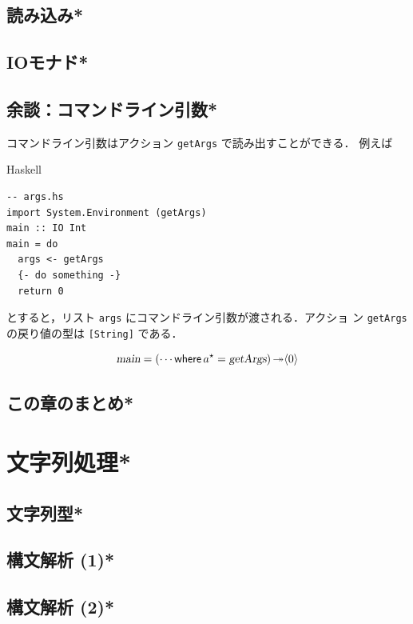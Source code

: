 \documentclass[a5paper,twoside,fleqn,draft]{jsbook}
\newcommand{\programminglanguage}[1]{\textsf{#1}}
\newcommand{\haskell}{\programminglanguage{Haskell}}
\newcommand{\code}[1]{\texttt{#1}}
\newenvironment{haskellcode}{\begin{itembox}[r]{\haskell}}{\end{itembox}}
\newcommand{\mKeyword}[1]{\mathsf{#1}} %
\newcommand{\mWhereKeyword}{\mKeyword{where}}
\DeclareMathOperator{\mWhere}{\mWhereKeyword}
\newcommand{\mAction}[1]{\textsl{#1}}
\DeclareMathOperator{\mMain}{\mAction{main}}
\DeclareMathOperator{\mBindRightIgnore}{\twoheadrightarrow}
\newcommand{\mPureWith}[1]{\langle#1\rangle}
\newcommand{\mList}[1]{{#1}^\mathrm{\star}}
\begin{document}
\section{読み込み*}
\section{IOモナド*}

\section{余談：コマンドライン引数*}

コマンドライン引数はアクション \code{getArgs} で読み出すことができる．
例えば
\begin{haskellcode}
\begin{verbatim}
-- args.hs
import System.Environment (getArgs)
main :: IO Int
main = do
  args <- getArgs
  {- do something -}
  return 0
\end{verbatim}
\end{haskellcode}
とすると，リスト \code{args} にコマンドライン引数が渡される．アクショ
ン \code{getArgs} の戻り値の型は \code{[String]} である．

\begin{equation}
\mMain=(\dotsb\mWhere{}\mList{a}=\mAction{getArgs})\mBindRightIgnore\mPureWith{0}
\end{equation}

\section{この章のまとめ*}

\chapter{文字列処理*}
\section{文字列型*}
\section{構文解析 (1)*}
\section{構文解析 (2)*}
\end{document}
